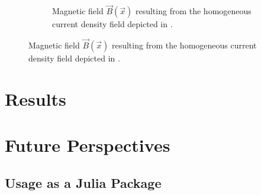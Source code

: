\documentclass[12pt]{article}
\begin{document}
\begin{figure}[H]
\begin{subfigure}[t]{0.48\textwidth}
      \caption{Magnetic field $\vec{B}(\vec{x})$ resulting from the homogeneous current density field depicted in .}
      \label{fig:demo-cdp-b-field}
    \end{subfigure}
  \end{figure}

  \section{Results}
  \section{Future Perspectives}
  \subsection{Usage as a Julia Package}

  \pagebreak
  \printbibliography
  \printnoidxglossary[type=acronym, title={Acronyms}]
\end{document}
